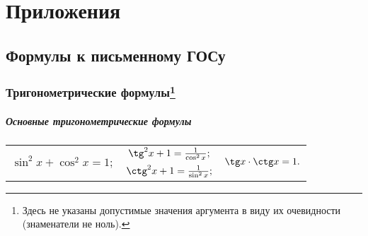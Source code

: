\part{Приложения}



\renewcommand*{\arraystretch}{1.85}

\everymath{\displaystyle}



\resetHeadWidth

\hypersetup{linkcolor = black, urlcolor = black} 

\chapter[Формулы к письменному ГОСу]{Формулы к письменному ГОСу}

\renewcommand{\mtcfont}{\normalsize}
\renewcommand{\mtcSfont}{\small}
\minitoc

\newpage
\section[Тригонометрические формулы]{Тригонометрические формулы\footnote{Здесь не указаны допустимые значения аргумента в виду их очевидности (знаменатели не ноль).}}

\subsubsection{Основные тригонометрические формулы}
\noindent\begin{tabular}{ c c c }
\multirow{2}{*}{$\sin^2x+\cos^2x=1;$}
&
$\tg^2x+1=\frac{1}{\cos^2x};$
&
\multirow{2}{*}{$\tg x\cdot\ctg x=1.$}
\\
&
$\ctg^2x+1=\frac{1}{\sin^2x};$
&
\end{tabular}

